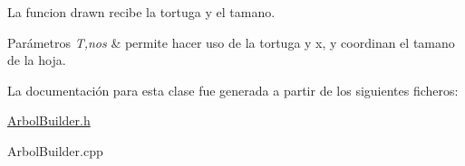 La funcion drawn recibe la tortuga y el tamano. 
\begin{DoxyParams}{Parámetros}
{\em T,nos} & permite hacer uso de la tortuga y x, y coordinan el tamano de la hoja. \\
\hline
\end{DoxyParams}


La documentación para esta clase fue generada a partir de los siguientes ficheros\+:\begin{DoxyCompactItemize}
\item 
\hyperlink{ArbolBuilder_8h}{Arbol\+Builder.\+h}\item 
Arbol\+Builder.\+cpp\end{DoxyCompactItemize}
